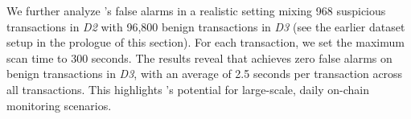 

We further analyze \name's false alarms in a realistic setting mixing 968 suspicious transactions in \textit{D2} with 96,800 benign transactions in \textit{D3} (see the earlier dataset setup in the prologue of this section).
For each transaction, we set the maximum scan time to 300 seconds.
The results reveal that \tool achieves zero false alarms on benign transactions in \textit{D3}, with an average of 2.5 seconds per transaction across all transactions. %
This highlights \name's potential for large-scale, daily on-chain monitoring scenarios.





